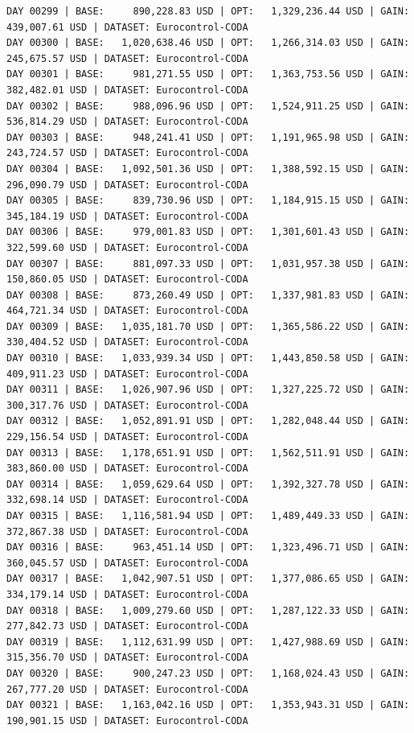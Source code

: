 \documentclass[11pt,a4paper]{article}
\begin{document}
\begin{verbatim}
DAY 00299 | BASE:     890,228.83 USD | OPT:   1,329,236.44 USD | GAIN: 439,007.61 USD | DATASET: Eurocontrol-CODA
DAY 00300 | BASE:   1,020,638.46 USD | OPT:   1,266,314.03 USD | GAIN: 245,675.57 USD | DATASET: Eurocontrol-CODA
DAY 00301 | BASE:     981,271.55 USD | OPT:   1,363,753.56 USD | GAIN: 382,482.01 USD | DATASET: Eurocontrol-CODA
DAY 00302 | BASE:     988,096.96 USD | OPT:   1,524,911.25 USD | GAIN: 536,814.29 USD | DATASET: Eurocontrol-CODA
DAY 00303 | BASE:     948,241.41 USD | OPT:   1,191,965.98 USD | GAIN: 243,724.57 USD | DATASET: Eurocontrol-CODA
DAY 00304 | BASE:   1,092,501.36 USD | OPT:   1,388,592.15 USD | GAIN: 296,090.79 USD | DATASET: Eurocontrol-CODA
DAY 00305 | BASE:     839,730.96 USD | OPT:   1,184,915.15 USD | GAIN: 345,184.19 USD | DATASET: Eurocontrol-CODA
DAY 00306 | BASE:     979,001.83 USD | OPT:   1,301,601.43 USD | GAIN: 322,599.60 USD | DATASET: Eurocontrol-CODA
DAY 00307 | BASE:     881,097.33 USD | OPT:   1,031,957.38 USD | GAIN: 150,860.05 USD | DATASET: Eurocontrol-CODA
DAY 00308 | BASE:     873,260.49 USD | OPT:   1,337,981.83 USD | GAIN: 464,721.34 USD | DATASET: Eurocontrol-CODA
DAY 00309 | BASE:   1,035,181.70 USD | OPT:   1,365,586.22 USD | GAIN: 330,404.52 USD | DATASET: Eurocontrol-CODA
DAY 00310 | BASE:   1,033,939.34 USD | OPT:   1,443,850.58 USD | GAIN: 409,911.23 USD | DATASET: Eurocontrol-CODA
DAY 00311 | BASE:   1,026,907.96 USD | OPT:   1,327,225.72 USD | GAIN: 300,317.76 USD | DATASET: Eurocontrol-CODA
DAY 00312 | BASE:   1,052,891.91 USD | OPT:   1,282,048.44 USD | GAIN: 229,156.54 USD | DATASET: Eurocontrol-CODA
DAY 00313 | BASE:   1,178,651.91 USD | OPT:   1,562,511.91 USD | GAIN: 383,860.00 USD | DATASET: Eurocontrol-CODA
DAY 00314 | BASE:   1,059,629.64 USD | OPT:   1,392,327.78 USD | GAIN: 332,698.14 USD | DATASET: Eurocontrol-CODA
DAY 00315 | BASE:   1,116,581.94 USD | OPT:   1,489,449.33 USD | GAIN: 372,867.38 USD | DATASET: Eurocontrol-CODA
DAY 00316 | BASE:     963,451.14 USD | OPT:   1,323,496.71 USD | GAIN: 360,045.57 USD | DATASET: Eurocontrol-CODA
DAY 00317 | BASE:   1,042,907.51 USD | OPT:   1,377,086.65 USD | GAIN: 334,179.14 USD | DATASET: Eurocontrol-CODA
DAY 00318 | BASE:   1,009,279.60 USD | OPT:   1,287,122.33 USD | GAIN: 277,842.73 USD | DATASET: Eurocontrol-CODA
DAY 00319 | BASE:   1,112,631.99 USD | OPT:   1,427,988.69 USD | GAIN: 315,356.70 USD | DATASET: Eurocontrol-CODA
DAY 00320 | BASE:     900,247.23 USD | OPT:   1,168,024.43 USD | GAIN: 267,777.20 USD | DATASET: Eurocontrol-CODA
DAY 00321 | BASE:   1,163,042.16 USD | OPT:   1,353,943.31 USD | GAIN: 190,901.15 USD | DATASET: Eurocontrol-CODA

\end{verbatim}
\end{document}
